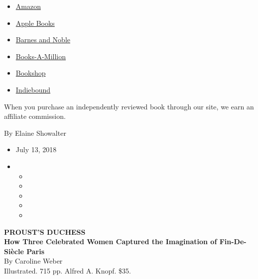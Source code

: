 \begin{itemize}
\tightlist
\item
  \href{https://www.amazon.com/gp/search?index=books\&tag=NYTBSREV-20\&field-keywords=Proust\%27s+Duchess\%3A+How+Three+Celebrated+Women+Captured+the+Imagination+of+Fin-De-Si\%C3\%A8cle+Paris+Caroline+Weber}{Amazon}
\item
  \href{https://du-gae-books-dot-nyt-du-prd.appspot.com/buy?title=Proust\%27s+Duchess\%3A+How+Three+Celebrated+Women+Captured+the+Imagination+of+Fin-De-Si\%C3\%A8cle+Paris\&author=Caroline+Weber}{Apple
  Books}
\item
  \href{https://www.anrdoezrs.net/click-7990613-11819508?url=https\%3A\%2F\%2Fwww.barnesandnoble.com\%2Fw\%2F\%3Fean\%3D9780307961785}{Barnes
  and Noble}
\item
  \href{https://www.anrdoezrs.net/click-7990613-35140?url=https\%3A\%2F\%2Fwww.booksamillion.com\%2Fp\%2FProust\%2527s\%2BDuchess\%253A\%2BHow\%2BThree\%2BCelebrated\%2BWomen\%2BCaptured\%2Bthe\%2BImagination\%2Bof\%2BFin-De-Si\%25C3\%25A8cle\%2BParis\%2FCaroline\%2BWeber\%2F9780307961785}{Books-A-Million}
\item
  \href{https://bookshop.org/a/3546/9780307961785}{Bookshop}
\item
  \href{https://www.indiebound.org/book/9780307961785?aff=NYT}{Indiebound}
\end{itemize}

When you purchase an independently reviewed book through our site, we
earn an affiliate commission.

By Elaine Showalter

\begin{itemize}
\item
  July 13, 2018
\item
  \begin{itemize}
  \item
  \item
  \item
  \item
  \item
  \end{itemize}
\end{itemize}

\textbf{PROUST'S DUCHESS}\\
\textbf{How Three Celebrated Women Captured the Imagination of
Fin-De-Siècle Paris}\\
By Caroline Weber\\
Illustrated. 715 pp. Alfred A. Knopf. \$35.

